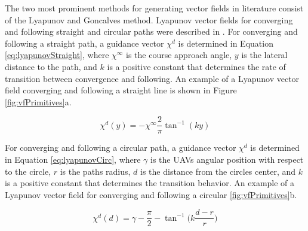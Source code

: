 \documentclass[conf]{new-aiaa}
\begin{document}
The two most prominent methods for generating vector fields in literature consist of the Lyapunov \cite{nelson_cooperative_2005,nelson_vector_2006,nelson_vector_2007,frew_cooperative_2007,miao_orthogonal_2016,griffiths_vector_2006} and Goncalves \cite{goncalves_artificial_2009,goncalves_circulation_2010,goncalves_vector_2010,gerlach_autonomous_2014} method. Lyapunov vector fields for converging and following straight and circular paths were described in \cite{nelson_cooperative_2005}. For converging and following a straight path, a guidance vector $\chi^{d}$ is determined in Equation \ref{eq:lyapunovStraight}, where $\chi^{\infty}$ is the course approach angle, $y$ is the lateral distance to the path, and $k$ is a positive constant that determines the rate of transition between convergence and following. An example of a Lyapunov vector field converging and following a straight line is shown in Figure \ref{fig:vfPrimitives}a.




\begin{equation}\label{eq:lyapunovStraight}
\chi^d(y) = -\chi^{\infty}\frac{2}{\pi}\tan^{-1}(ky)
\end{equation}



For converging and following a circular path, a guidance vector $\chi^{d}$ is determined in Equation \ref{eq:lyapunovCirc}, where $\gamma$ is the UAVs angular position with respect to the circle, $r$ is the paths radius, $d$ is the distance from the circles center, and $k$ is a positive constant that determines the transition behavior. An example of a Lyapunov vector field for converging and following a circular \ref{fig:vfPrimitives}b.

\begin{equation}\label{eq:lyapunovCirc}
\chi^d(d) = \gamma-\frac{\pi}{2}-\tan^{-1} \bigg(k \frac{d-r}{r} \bigg)
\end{equation}
\end{document}
